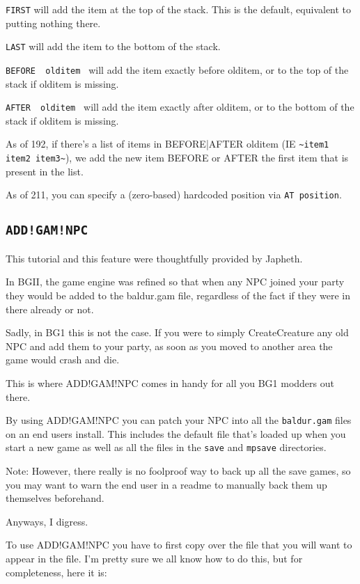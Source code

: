 \documentclass{article}
\def\ttref#1{\ahrefloc{#1}{\tt #1}}
\def\t#1{{\tt #1}}
\begin{document}
  \t{FIRST} will add the item at the top of the stack.
     This is the default, equivalent to putting nothing there.

  \t{LAST} will add the item to the bottom of the stack.

  \t{BEFORE ~olditem~} will add the item exactly before olditem,
    or to the top of the stack if olditem is missing.

  \t{AFTER  ~olditem~} will add the item exactly after olditem,
    or to the bottom of the stack if olditem is missing.

As of 192, if there's a list of items in BEFORE|AFTER olditem (IE \verb+~item1 item2 item3~+),
we add the new item BEFORE or AFTER the first item that is present in the list.

As of 211, you can specify a (zero-based) hardcoded position via \verb+AT position+.

\label{sec-add-gam-npc}\subsection{\tt{ADD!GAM!NPC}}
This tutorial and this feature were thoughtfully provided by Japheth.

In BGII, the game engine was refined so that when any NPC joined your party
they would be added to the baldur.gam file, regardless of the fact if they
were in there already or not.

Sadly, in BG1 this is not the case.  If you were to simply CreateCreature
any old NPC and add them to your party, as soon as you moved to another
area the game would crash and die.

This is where ADD!GAM!NPC comes in handy for all you BG1 modders out there.

By using ADD!GAM!NPC you can patch your NPC into all the \t{baldur.gam}
files on an end users install.  This includes the default \ttref{GAM} file
that's loaded up when you start a new game as well as all the \ttref{GAM}
files in the \t{save} and \t{mpsave} directories.

Note: However, there really is no foolproof way to back up all the save
games, so you may want to warn the end user in a readme to manually back
them up themselves beforehand.

Anyways, I digress.

To use ADD!GAM!NPC you have to first copy over the \ttref{CRE} file that
you will want to appear in the \ttref{GAM} file.  I'm pretty sure we all
know how to do this, but for completeness, here it is:
\end{document}
